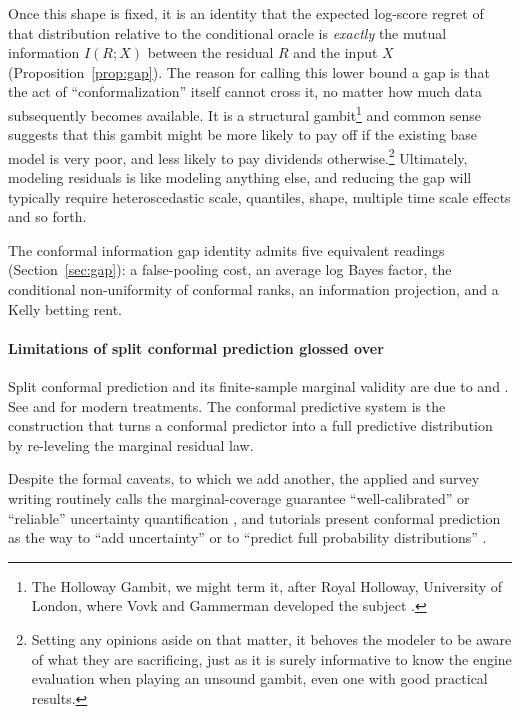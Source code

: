 \documentclass[11pt]{article}
\theoremstyle{definition}
\begin{document}
Once this shape is fixed, it is an identity that the expected log-score regret of that distribution relative to the
conditional oracle is \emph{exactly} the mutual information $I(R;X)$ between the residual
$R$ and the input $X$ (Proposition~\ref{prop:gap}). The reason for calling this lower bound a gap is that the act of ``conformalization'' itself
cannot cross it, no matter how much data subsequently becomes available. It is a structural gambit\footnote{The Holloway Gambit, we might term it, after Royal
Holloway, University of London, where Vovk and Gammerman developed the subject
\citep{vovk2005algorithmic}.} and
common sense suggests that this gambit might be more likely to pay off if the existing base
model is very poor, and less likely to pay dividends otherwise.\footnote{Setting any
opinions aside on that matter, it behoves the modeler to be aware of what they are
sacrificing, just as it is surely informative to know the engine evaluation when playing an
unsound gambit, even one with good practical results.} Ultimately, modeling residuals is
like modeling anything else, and reducing the gap will typically require heteroscedastic
scale, quantiles, shape, multiple time scale effects and so forth.


The conformal information gap identity admits five equivalent readings (Section~\ref{sec:gap}): a
false-pooling cost, an average log Bayes factor, the conditional non-uniformity of
conformal ranks, an information projection, and a Kelly betting rent.

\paragraph{Limitations of split conformal prediction glossed over}

Split conformal prediction and its finite-sample marginal validity are due to
\citet{vovk2005algorithmic} and \citet{lei2018distribution}. See \citet{angelopoulos2023gentle}
and \citet{angelopoulos2025theoretical} for modern treatments. The conformal predictive
system \citep{vovk2019nonparametric} is the construction that turns a conformal predictor
into a full predictive distribution by re-leveling the marginal residual law.

Despite the formal caveats, to which we add another, the applied and survey writing routinely calls the marginal-coverage guarantee
``well-calibrated'' or ``reliable'' uncertainty quantification
\citep{bellotti2025trustworthy}, and tutorials present conformal prediction as the way to
``add uncertainty'' \citep{tds_adduncertainty} or to ``predict full probability
distributions'' \citep{manokhin_fulldist}.
\end{document}
